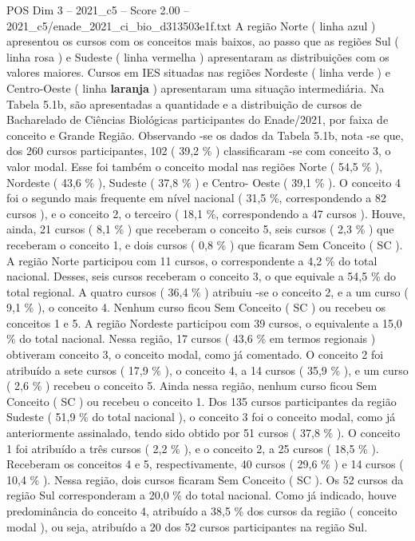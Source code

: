 \begin{textsample}{POS Dim 3 – 2021\_c5 – Score 2.00 – 2021\_c5/enade\_2021\_ci\_bio\_d313503e1f.txt}
A região Norte ( linha azul ) apresentou os cursos com os conceitos mais baixos, ao passo que as regiões Sul ( linha rosa ) e Sudeste ( linha vermelha ) apresentaram as distribuições com os valores maiores.
Cursos em IES situadas nas regiões Nordeste ( linha verde ) e Centro-Oeste ( linha \textbf{laranja} ) apresentaram uma situação intermediária.
Na Tabela 5.1b, são apresentadas a quantidade e a distribuição de cursos de Bacharelado de Ciências Biológicas participantes do Enade/2021, por faixa de conceito e Grande Região.
Observando -se os dados da Tabela 5.1b, nota -se que, dos 260 cursos participantes, 102 ( 39,2 \% ) classificaram -se com conceito 3, o valor modal.
Esse foi também o conceito modal nas regiões Norte ( 54,5 \% ), Nordeste ( 43,6 \% ), Sudeste ( 37,8 \% ) e Centro- Oeste ( 39,1 \% ).
O conceito 4 foi o segundo mais frequente em nível nacional ( 31,5 \%, correspondendo a 82 cursos ), e o conceito 2, o terceiro ( 18,1 \%, correspondendo a 47 cursos ).
Houve, ainda, 21 cursos ( 8,1 \% ) que receberam o conceito 5, seis cursos ( 2,3 \% ) que receberam o conceito 1, e dois cursos ( 0,8 \% ) que ficaram Sem Conceito ( SC ).
A região Norte participou com 11 cursos, o correspondente a 4,2 \% do total nacional.
Desses, seis cursos receberam o conceito 3, o que equivale a 54,5 \% do total regional.
A quatro cursos ( 36,4 \% ) atribuiu -se o conceito 2, e a um curso ( 9,1 \% ), o conceito 4.
Nenhum curso ficou Sem Conceito ( SC ) ou recebeu os conceitos 1 e 5.
A região Nordeste participou com 39 cursos, o equivalente a 15,0 \% do total nacional.
Nessa região, 17 cursos ( 43,6 \% em termos regionais ) obtiveram conceito 3, o conceito modal, como já comentado.
O conceito 2 foi atribuído a sete cursos ( 17,9 \% ), o conceito 4, a 14 cursos ( 35,9 \% ), e um curso ( 2,6 \% ) recebeu o conceito 5.
Ainda nessa região, nenhum curso ficou Sem Conceito ( SC ) ou recebeu o conceito 1.
Dos 135 cursos participantes da região Sudeste ( 51,9 \% do total nacional ), o conceito 3 foi o conceito modal, como já anteriormente assinalado, tendo sido obtido por 51 cursos ( 37,8 \% ).
O conceito 1 foi atribuído a três cursos ( 2,2 \% ), e o conceito 2, a 25 cursos ( 18,5 \% ).
Receberam os conceitos 4 e 5, respectivamente, 40 cursos ( 29,6 \% ) e 14 cursos ( 10,4 \% ).
Nessa região, dois cursos ficaram Sem Conceito ( SC ).
Os 52 cursos da região Sul corresponderam a 20,0 \% do total nacional.
Como já indicado, houve predominância do conceito 4, atribuído a 38,5 \% dos cursos da região ( conceito modal ), ou seja, atribuído a 20 dos 52 cursos participantes na região Sul.

\end{textsample}

